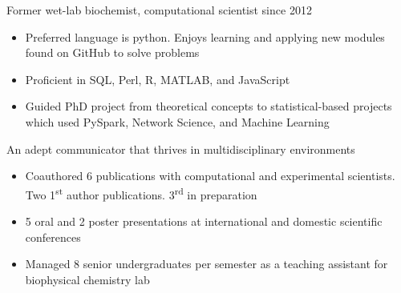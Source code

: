 

\begin{cventries}
\vspace{-4.0mm}

  \cventry
    {} %
    {} %
    {} %
    {} %
    {
      \begin{cvitems} %
      	\item {Former wet-lab biochemist, computational scientist since 2012}
      		\begin{itemize}
      			\item Preferred language is python. Enjoys learning and applying new modules found on GitHub to solve problems
      			\item Proficient in SQL, Perl, R, MATLAB, and JavaScript
      			\item Guided PhD project from theoretical concepts to statistical-based projects which used PySpark, Network Science, and Machine Learning
      		\end{itemize}	
\vspace{1.0mm}
        \item {An adept communicator that thrives in multidisciplinary environments}
        	\begin{itemize}
         		\item Coauthored 6 publications with computational and experimental scientists. Two 1\textsuperscript{st} author publications. 3\textsuperscript{rd} in preparation
         		\item 5 oral and 2 poster presentations at international and domestic scientific conferences
         		\item Managed 8 senior undergraduates per semester as a teaching assistant for biophysical chemistry lab
        	\end{itemize}
      \end{cvitems}
    }
\vspace{-4.0mm}
\end{cventries}
